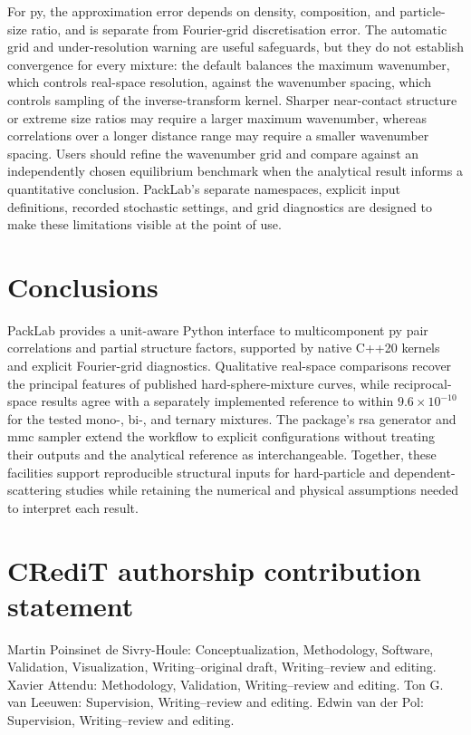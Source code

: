 \documentclass[preprint,12pt]{elsarticle}
\begin{document}
For \gls{py}, the approximation error depends on density, composition, and particle-size ratio, and is separate from Fourier-grid discretisation error. %
The automatic grid and under-resolution warning are useful safeguards, but they do not establish convergence for every mixture: the default balances the maximum wavenumber, which controls real-space resolution, against the wavenumber spacing, which controls sampling of the inverse-transform kernel. %
Sharper near-contact structure or extreme size ratios may require a larger maximum wavenumber, whereas correlations over a longer distance range may require a smaller wavenumber spacing. %
Users should refine the wavenumber grid and compare against an independently chosen equilibrium benchmark when the analytical result informs a quantitative conclusion. %
PackLab's separate namespaces, explicit input definitions, recorded stochastic settings, and grid diagnostics are designed to make these limitations visible at the point of use. %

\section{Conclusions}

PackLab provides a unit-aware Python interface to multicomponent \gls{py} pair correlations and partial structure factors, supported by native C++20 kernels and explicit Fourier-grid diagnostics. %
Qualitative real-space comparisons recover the principal features of published hard-sphere-mixture curves, while reciprocal-space results agree with a separately implemented reference to within $9.6\times10^{-10}$ for the tested mono-, bi-, and ternary mixtures. %
The package's \gls{rsa} generator and \gls{mmc} sampler extend the workflow to explicit configurations without treating their outputs and the analytical reference as interchangeable. %
Together, these facilities support reproducible structural inputs for hard-particle and dependent-scattering studies while retaining the numerical and physical assumptions needed to interpret each result. %

\section*{CRediT authorship contribution statement}

Martin Poinsinet de Sivry-Houle: Conceptualization, Methodology, Software, Validation, Visualization, Writing--original draft, Writing--review and editing. %
Xavier Attendu: Methodology, Validation, Writing--review and editing. %
Ton G. van Leeuwen: Supervision, Writing--review and editing. %
Edwin van der Pol: Supervision, Writing--review and editing. %
\end{document}
